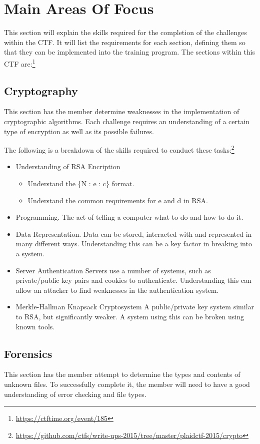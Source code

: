 \documentclass[a4paper,11pt]{report}
\begin{document}
	\section{Main Areas Of Focus}
		This section will explain the skills required for the completion of the challenges within the CTF. 
		It will list the requirements for each section, defining them so that they can be implemented into the training program. 
		The sections within this CTF are:\footnote{\url{https://ctftime.org/event/185}}
		\subsection{Cryptography}
			This section has the member determine weaknesses in the implementation of cryptographic algorithms. 
			Each challenge requires an understanding of a certain type of encryption as well as its possible failures. 


			The following is a breakdown of the skills required to conduct these tasks:\footnote{\url{https://github.com/ctfs/write-ups-2015/tree/master/plaidctf-2015/crypto}}
			\begin{itemize}
				\item Understanding of RSA Encription
				\begin{itemize}
					\item Understand the \{N : e : c\} format. 
					\item Understand the common requirements for e and d in RSA. 
				\end{itemize}
				\item Programming. 
					The act of telling a computer what to do and how to do it. 
				\item Data Representation. 
					Data can be stored, interacted with and represented in many different ways. 
					Understanding this can be a key factor in breaking into a system. 
				\item Server Authentication
					Servers use a number of systems, such as private/public key pairs and cookies to authenticate. 
					Understanding this can allow an attacker to find weaknesses in the authentication system. 
				\item Merkle-Hallman Knapsack Cryptosystem
					A public/private key system similar to RSA, but significantly weaker. 
					A system using this can be broken using known tools. 
			\end{itemize}
		\subsection{Forensics}
			This section has the member attempt to determine the types and contents of unknown files. 
			To successfully complete it, the member will need to have a good understanding of error checking and file types. 
\end{document}
